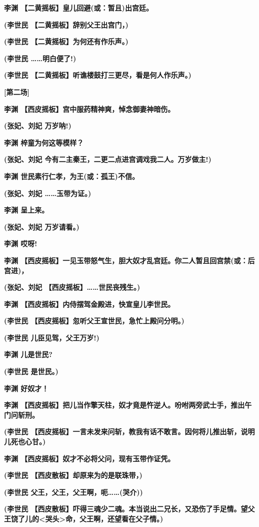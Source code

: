 \textbf{李渊 【二黄摇板】皇儿回避(或：暂且)出宫廷。}

\textbf{(李世民 【二黄摇板】辞别父王出宫门，)}

\textbf{(李世民 【二黄摇板】为何还有作乐声。)}

\textbf{(李世民 \ldots{}\ldots{}明白便了!)}

\textbf{(李世民 【二黄摇板】听谯楼鼓打三更尽，看是何人作乐声。)}

\textbf{{[}第二场{]}}

\textbf{李渊 【西皮摇板】宫中服药精神爽，悼念御妻神暗伤。}

\textbf{(张妃、刘妃 万岁呐!)}

\textbf{李渊 梓童为何这等模样？}

\textbf{(张妃、刘妃 今有二主秦王，二更二点进宫调戏我二人。万岁做主!)}

\textbf{李渊 世民素行仁孝，为王(或：孤王)不信。}

\textbf{(张妃、刘妃 \ldots{}\ldots{}玉带为证。)}

\textbf{李渊 呈上来。}

\textbf{(张妃、刘妃 万岁请看。)}

\textbf{李渊 哎呀!}

\textbf{李渊
【西皮摇板】一见玉带怒气生，胆大奴才乱宫廷。你二人暂且回宫禁(或：后宫进)，}

\textbf{(张妃、刘妃 【西皮摇板】\ldots{}\ldots{}世民丧残生。)}

\textbf{李渊 【西皮摇板】内侍摆驾金殿进，快宣皇儿李世民。}

\textbf{(李世民 【西皮摇板】忽听父王宣世民，急忙上殿问分明。)}

\textbf{(李世民 儿臣见驾，父王万岁!)}

\textbf{李渊 儿是世民?}

\textbf{(李世民 是世民。)}

\textbf{李渊 好奴才！}

\textbf{李渊
【西皮摇板】把儿当作擎天柱，奴才竟是忤逆人。吩咐两旁武士手，推出午门问斩刑。}

\textbf{(李世民
【西皮摇板】一言未发来问斩，教我有话不敢言。因何将儿推出斩，说明儿死也心甘。)}

\textbf{李渊 【西皮摇板】奴才不必将父问，现有玉带作证凭。}

\textbf{(李世民 【西皮散板】却原来为的是联珠带，)}

\textbf{(李世民 父王，父王，父王啊，呃\ldots{}\ldots{}(哭介))}

\textbf{(李世民
【西皮散板】吓得三魂少二魂。本当说出二兄长，又恐伤了手足情。望父王饶了儿的\textless{}哭头\textgreater{}命，父王啊，还望看在父子情。)}

